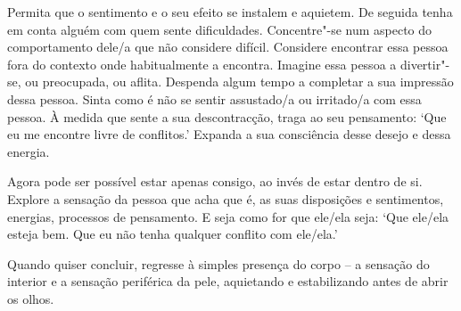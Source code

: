 Permita que o sentimento e o seu efeito se instalem e aquietem. De seguida tenha
em conta alguém com quem sente dificuldades. Concentre"-se num aspecto do
comportamento dele/a que não considere difícil. Considere encontrar essa pessoa
fora do contexto onde habitualmente a encontra. Imagine essa pessoa a
divertir"-se, ou preocupada, ou aflita. Despenda algum tempo a completar a sua
impressão dessa pessoa. Sinta como é não se sentir assustado/a ou irritado/a com
essa pessoa. À medida que sente a sua descontracção, traga ao seu pensamento:
`Que eu me encontre livre de conflitos.' Expanda a sua consciência desse desejo
e dessa energia.

Agora pode ser possível estar apenas consigo, ao invés de estar dentro de si.
Explore a sensação da pessoa que acha que é, as suas disposições e sentimentos,
energias, processos de pensamento. E seja como for que ele/ela seja: `Que
ele/ela esteja bem. Que eu não tenha qualquer conflito com ele/ela.'

Quando quiser concluir, regresse à simples presença do corpo -- a sensação do
interior e a sensação periférica da pele, aquietando e estabilizando antes de
abrir os olhos.
